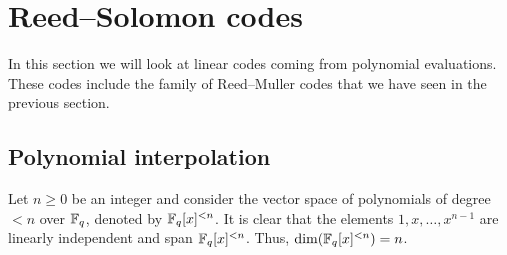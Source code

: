 \documentclass[../main.tex]{subfiles}
\begin{document}
\section{Reed--Solomon codes}

In this section we will look at linear codes coming from polynomial evaluations. These codes include the family of Reed--Muller codes that we have seen in the previous section.

\subsection{Polynomial interpolation}

Let $n \geq 0$ be an integer and consider the vector space of polynomials of degree $< n$ over $\mathbb{F}_q$, denoted by $\mathbb{F}_q[x]^{< n}$. It is clear that the elements $1, x, \dots, x^{n-1}$ are linearly independent and span $\mathbb{F}_q[x]^{< n}$. Thus, $\dim(\mathbb{F}_q[x]^{< n}) = n$.
\end{document}
